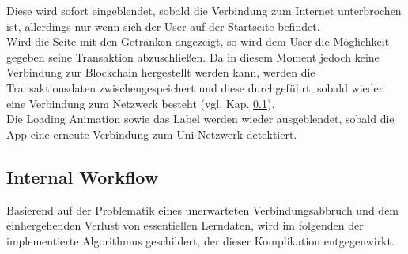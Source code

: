 Diese wird sofort eingeblendet, sobald die Verbindung zum Internet unterbrochen ist, allerdings nur wenn sich der User auf der Startseite befindet. \\
Wird die Seite mit den Getränken angezeigt, so wird dem User die Möglichkeit gegeben seine Transaktion abzuschließen. Da in diesem Moment jedoch keine Verbindung zur Blockchain hergestellt werden kann, werden die Transaktionsdaten zwischengespeichert und diese durchgeführt, sobald wieder eine Verbindung zum Netzwerk besteht (vgl. Kap. \ref{subsec:internalFlow}).\\
Die Loading Animation sowie das  Label werden wieder ausgeblendet, sobald die App eine erneute Verbindung zum Uni-Netzwerk detektiert.

\subsection{Internal Workflow}
\label{subsec:internalFlow}
Basierend auf der Problematik eines unerwarteten Verbindungsabbruch und dem einhergehenden Verlust von essentiellen Lerndaten, wird im folgenden der implementierte Algorithmus geschildert, der dieser Komplikation entgegenwirkt. 

